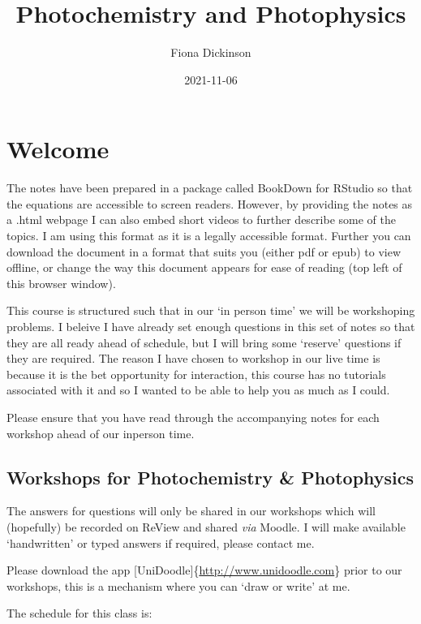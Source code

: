 \documentclass[
]{book}
\title{Photochemistry and Photophysics}
\author{Fiona Dickinson}
\date{2021-11-06}
\begin{document}
\maketitle

{
\setcounter{tocdepth}{1}
\tableofcontents
}
\hypertarget{welcome}{%
\chapter{Welcome}\label{welcome}}

The notes have been prepared in a package called BookDown for RStudio so that the equations are accessible to screen readers. However, by providing the notes as a .html webpage I can also embed short videos to further describe some of the topics. I am using this format as it is a legally accessible format. Further you can download the document in a format that suits you (either pdf or epub) to view offline, or change the way this document appears for ease of reading (top left of this browser window).

This course is structured such that in our `in person time' we will be workshoping problems. I beleive I have already set enough questions in this set of notes so that they are all ready ahead of schedule, but I will bring some `reserve' questions if they are required. The reason I have chosen to workshop in our live time is because it is the bet opportunity for interaction, this course has no tutorials associated with it and so I wanted to be able to help you as much as I could.

Please ensure that you have read through the accompanying notes for each workshop ahead of our inperson time.

\hypertarget{workshops-for-photochemistry-photophysics}{%
\section{Workshops for Photochemistry \& Photophysics}\label{workshops-for-photochemistry-photophysics}}

The answers for questions will only be shared in our workshops which will (hopefully) be recorded on ReView and shared \emph{via} Moodle. I will make available `handwritten' or typed answers if required, please contact me.

Please download the app {[}UniDoodle{]}\{\url{http://www.unidoodle.com}\} prior to our workshops, this is a mechanism where you can `draw or write' at me.

The schedule for this class is:
\end{document}

